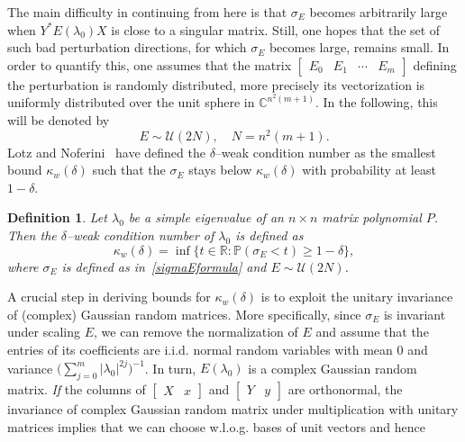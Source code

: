 \documentclass[12pt]{article}
\newcommand{\C}{\mathbb{C}}
\newtheorem{definition}[theorem]{Definition}
\begin{document}
The main difficulty in continuing from here is that $\sigma_E$ becomes arbitrarily large when $Y^*E(\lambda_0) X$ is close to a singular matrix. Still, one hopes that the set of such bad perturbation directions, for which $\sigma_E$ becomes large, remains small. In order to quantify this, one assumes that the matrix $\begin{bmatrix}
    E_0 & E_1 & \cdots &E_m
\end{bmatrix}$ defining the perturbation is randomly distributed, more precisely its vectorization is uniformly distributed over the unit sphere in $\C^{n^2(m+1)}$. In the following, this will be denoted by
\[
 E\sim \mathcal{U}(2N), \quad N=n^2(m+1).
\]
Lotz and Noferini~\cite{lotz2020wilkinson} have defined the $\delta$--weak condition number as the smallest bound $\kappa_w(\delta)$ such that the $\sigma_E$ stays below $\kappa_w(\delta)$ with probability at least $1-\delta$.
\begin{definition}
Let $\lambda_0$ be a simple eigenvalue of an $n\times n$ matrix polynomial $P$. Then 
the $\delta$--weak condition number of $\lambda_0$ is defined as
\[
    \kappa_w(\delta) = \inf \{t\in \mathbb{R}: \mathbb{P}(\sigma_E < t)\geq 1-\delta \},
\]
where $\sigma_E$ is defined as in~\eqref{sigmaEformula} and $E\sim \mathcal{U}(2N)$.
\end{definition}
A crucial step in deriving bounds for $\kappa_w(\delta)$ is to exploit the unitary invariance of (complex) Gaussian random matrices. More specifically, since $\sigma_E$ is invariant under scaling $E$, we can remove the normalization of $E$ and assume that the entries of its coefficients are i.i.d. normal random variables with mean $0$ and variance $\big( \sum^m_{j=0}|\lambda_0|^{2j} \big)^{-1}$. In turn, $E(\lambda_0)$ is a complex Gaussian random matrix. \emph{If} the columns of $\begin{bmatrix}
    X & x
\end{bmatrix}$ and $\begin{bmatrix}
    Y & y
\end{bmatrix}$ are orthonormal, the invariance of complex Gaussian random matrix under multiplication with unitary matrices implies that we can choose w.l.o.g. bases of unit vectors and hence 
\end{document}
